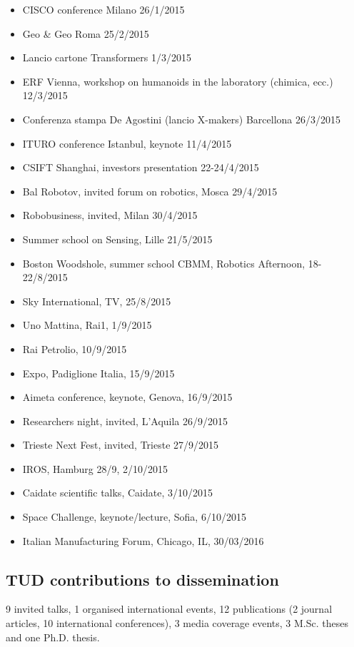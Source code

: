 \begin{itemize}
\item CISCO conference Milano 26/1/2015
\item Geo \& Geo Roma 25/2/2015
\item Lancio cartone Transformers 1/3/2015
\item ERF Vienna, workshop on humanoids in the laboratory (chimica, ecc.) 12/3/2015
\item Conferenza stampa De Agostini (lancio X-makers) Barcellona 26/3/2015
\item ITURO conference Istanbul, keynote 11/4/2015
\item CSIFT Shanghai, investors presentation 22-24/4/2015
\item Bal Robotov, invited forum on robotics, Mosca 29/4/2015
\item Robobusiness, invited, Milan 30/4/2015
\item Summer school on Sensing, Lille 21/5/2015
\item Boston Woodshole, summer school CBMM, Robotics Afternoon, 18-22/8/2015
\item Sky International, TV, 25/8/2015
\item Uno Mattina, Rai1, 1/9/2015
\item Rai Petrolio, 10/9/2015
\item Expo, Padiglione Italia, 15/9/2015
\item Aimeta conference, keynote, Genova, 16/9/2015
\item Researchers night, invited, L’Aquila 26/9/2015
\item Trieste Next Fest, invited, Trieste 27/9/2015
\item IROS, Hamburg 28/9, 2/10/2015
\item Caidate scientific talks, Caidate, 3/10/2015
\item Space Challenge, keynote/lecture, Sofia, 6/10/2015
\item Italian Manufacturing Forum, Chicago, IL, 30/03/2016
\end{itemize}

\subsection{TUD contributions to dissemination}

9 invited talks, 1 organised international events, 12 publications (2 journal articles, 10 international conferences), 3 media coverage events, 3 M.Sc. theses and one Ph.D. thesis. 

